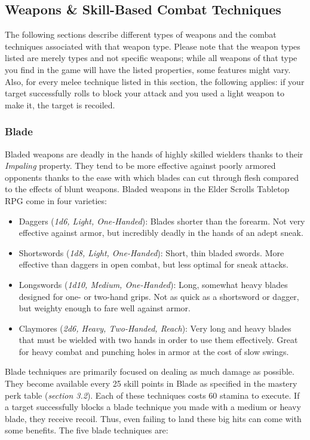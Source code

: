 \subsection{Weapons \& Skill-Based Combat Techniques}

The following sections describe different types of weapons and the combat techniques associated with that weapon type. Please note that the weapon types listed are merely types and not specific weapons; while all weapons of that type you find in the game will have the listed properties, some features might vary. Also, for every melee technique listed in this section, the following applies: if your target successfully rolls to block your attack and you used a light weapon to make it, the target is recoiled.

\subsubsection{Blade}

Bladed weapons are deadly in the hands of highly skilled wielders thanks to their \textit{Impaling} property. They tend to be more effective against poorly armored opponents thanks to the ease with which blades can cut through flesh compared to the effects of blunt weapons. Bladed weapons in the Elder Scrolls Tabletop RPG come in four varieties:

\begin{itemize}
	\item Daggers (\textit{1d6, Light, One-Handed}): Blades shorter than the forearm. Not very effective against armor, but incredibly deadly in the hands of an adept sneak.
	\item Shortswords (\textit{1d8, Light, One-Handed}): Short, thin bladed swords. More effective than daggers in open combat, but less optimal for sneak attacks.
	\item Longswords (\textit{1d10, Medium, One-Handed}): Long, somewhat heavy blades designed for one- or two-hand grips. Not as quick as a shortsword or dagger, but weighty enough to fare well against armor.
	\item Claymores (\textit{2d6, Heavy, Two-Handed, Reach}): Very long and heavy blades that must be wielded with two hands in order to use them effectively. Great for heavy combat and punching holes in armor at the cost of slow swings.
\end{itemize}

Blade techniques are primarily focused on dealing as much damage as possible. They become available every 25 skill points in Blade as specified in the mastery perk table (\textit{section 3.2}). Each of these techniques costs 60 stamina to execute. If a target successfully blocks a blade technique you made with a medium or heavy blade, they receive recoil. Thus, even failing to land these big hits can come with some benefits. The five blade techniques are:

